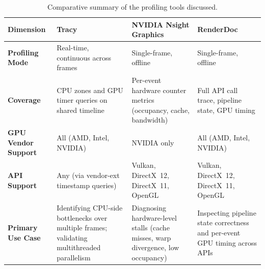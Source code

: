 \begin{table}[htbp]
\centering
\small
\renewcommand{\arraystretch}{1.2}
\caption{Comparative summary of the profiling tools discussed.}
\label{tab:profiling-tools}
\begin{tabular}{|p{2.8cm}|p{3.5cm}|p{3.5cm}|p{3.5cm}|}
\hline
\textbf{Dimension} & \textbf{Tracy} & \textbf{NVIDIA Nsight Graphics} & \textbf{RenderDoc} \\
\hline
\textbf{Profiling Mode} & Real-time, continuous across frames & Single-frame, offline & Single-frame, offline \\
\hline
\textbf{Coverage} & CPU zones and GPU timer queries on shared timeline & Per-event hardware counter metrics (occupancy, cache, bandwidth) & Full API call trace, pipeline state, GPU timing \\
\hline
\textbf{GPU Vendor Support} & All (AMD, Intel, NVIDIA) & NVIDIA only & All (AMD, Intel, NVIDIA) \\
\hline
\textbf{API Support} & Any (via vendor-ext timestamp queries) & Vulkan, DirectX~12, DirectX~11, OpenGL & Vulkan, DirectX~12, DirectX~11, OpenGL \\
\hline
\textbf{Primary Use Case} & Identifying CPU-side bottlenecks over multiple frames; validating multithreaded parallelism & Diagnosing hardware-level stalls (cache misses, warp divergence, low occupancy) & Inspecting pipeline state correctness and per-event GPU timing across APIs \\
\hline
\end{tabular}
\end{table}

